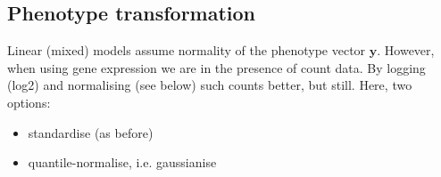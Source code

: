 





\subsection{Phenotype transformation}

Linear (mixed) models assume normality of the phenotype vector $\mathbf{y}$.
However, when using gene expression we are in the presence of count data.
By logging (log2) and normalising (see below) such counts better, but still.
Here, two options:

\begin{itemize}
    \item standardise (as before)
    \item quantile-normalise, i.e. gaussianise
\end{itemize}

